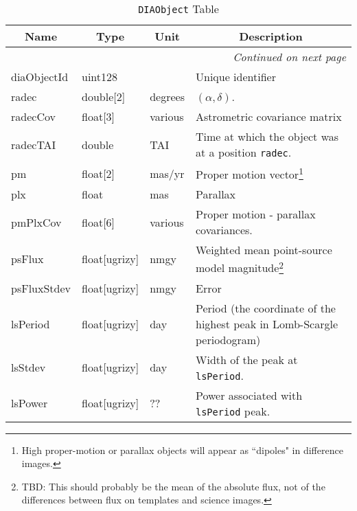 \documentclass[12pt]{article}
\newcommand{\code}[1]{\texttt{#1}}
\newcommand{\DIAObject}{\code{DIAObject}\xspace}
\begin{document}
\begin{center}
\begin{longtable}{p{3cm}p{2cm}p{2cm}p{5cm}}
\caption[\DIAObject Table]{\DIAObject Table} \\

\hline \multicolumn{1}{c}{\bf Name} & \multicolumn{1}{c}{\bf Type} & \multicolumn{1}{c}{\bf Unit} & \multicolumn{1}{c}{\bf Description} \\ \hline
\endhead

\hline \multicolumn{4}{r}{{\em Continued on next page}} \\
\endfoot

\hline\hline
\endlastfoot

diaObjectId & uint128 & ~ & Unique identifier \\ 

radec & double[2] & degrees & $(\alpha, \delta)$. \\ 

radecCov & float[3] & various & Astrometric covariance matrix \\ 

radecTAI & double & TAI & Time at which the object was at a position \texttt{radec}. \\ 

pm & float[2] & mas/yr & Proper motion vector\footnote{High proper-motion or parallax objects will appear as ``dipoles" in difference images.} \\ 

plx & float & mas & Parallax \\ 

pmPlxCov & float[6] & various & Proper motion - parallax covariances. \\ 

psFlux & float[ugrizy] & nmgy & Weighted mean point-source model magnitude\footnote{TBD: This should probably be the mean of the absolute flux, not of the differences between flux on templates and science images.} \\ 

psFluxStdev & float[ugrizy] & nmgy & Error  \\ 

lsPeriod  & float[ugrizy] & day & Period (the coordinate of the highest peak in Lomb-Scargle periodogram) \\

lsStdev  & float[ugrizy] & day & Width of the peak at \texttt{lsPeriod}. \\

lsPower   & float[ugrizy] & ?? & Power associated with \texttt{lsPeriod} peak. \\


\end{longtable}
\end{center}
\end{document}
